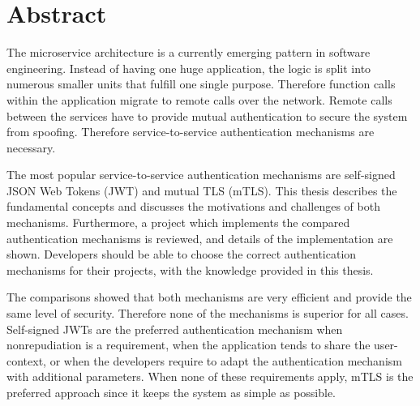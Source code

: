 \chapter{Abstract}
The microservice architecture is a currently emerging pattern in software engineering.
Instead of having one huge application, the logic is split into numerous smaller units that fulfill one single purpose.
Therefore function calls within the application migrate to remote calls over the network.
Remote calls between the services have to provide mutual authentication to secure the system from spoofing.
Therefore service-to-service authentication mechanisms are necessary. 

The most popular service-to-service authentication mechanisms are self-signed JSON Web Tokens (JWT) and mutual TLS (mTLS).
This thesis describes the fundamental concepts and discusses the motivations and challenges of both mechanisms.
Furthermore, a project which implements the compared authentication mechanisms is reviewed, and details of the implementation are shown.
Developers should be able to choose the correct authentication mechanisms for their projects, with the knowledge provided in this thesis.

The comparisons showed that both mechanisms are very efficient and provide the same level of security.
Therefore none of the mechanisms is superior for all cases.
Self-signed JWTs are the preferred authentication mechanism when nonrepudiation is a requirement, when the application tends to share the user-context, or when the developers require to adapt the authentication mechanism with additional parameters.
When none of these requirements apply, mTLS is the preferred approach since it keeps the system as simple as possible.

